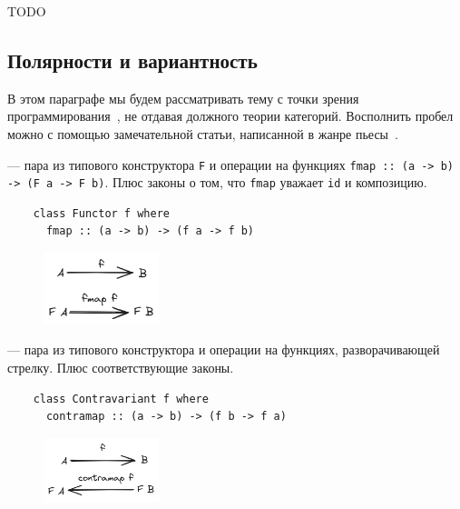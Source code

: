 



TODO %

\subsection{Полярности и вариантность} \label{subsec:variance}

В этом параграфе мы будем рассматривать тему с точки зрения программирования~\cite[глава 3]{maguire-types}, не отдавая должного теории категорий.
Восполнить пробел можно с помощью замечательной статьи, написанной в жанре пьесы~\cite{hinze2012functional}.

 --- пара из типового конструктора \texttt{F} и операции на функциях \texttt{fmap :: (a -> b) -> (F a -> F b)}.
Плюс законы о том, что \texttt{fmap} уважает \texttt{id} и композицию.

\begin{verbatim}
    class Functor f where
      fmap :: (a -> b) -> (f a -> f b)
\end{verbatim}

\begin{figure}[H]
    \centering
    \includegraphics[width=0.3\textwidth]{figs/functor}
\end{figure}

 --- пара из типового конструктора и операции на функциях, разворачивающей стрелку.
Плюс соответствующие законы.

\begin{verbatim}
    class Contravariant f where
      contramap :: (a -> b) -> (f b -> f a)
\end{verbatim}

\begin{figure}[H]
    \centering
    \includegraphics[width=0.3\textwidth]{figs/contra-functor}
\end{figure}

